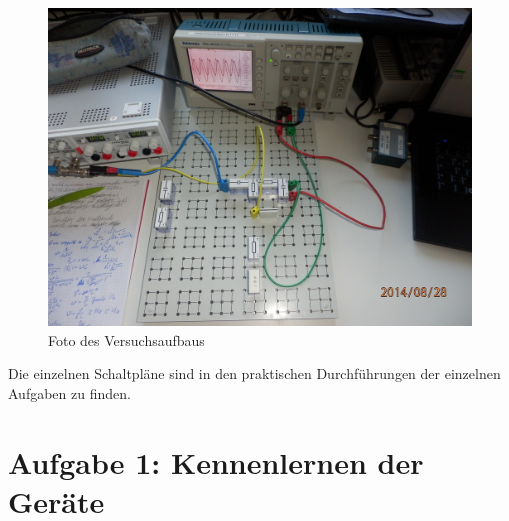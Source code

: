 \documentclass[12pt]{scrartcl}
\begin{document}
\begin{figure}[htbp] 
  \centering
    \includegraphics[scale = 0.1]{aufbau.JPG}
  	\caption[Foto des Versuchsaufbaus]{Foto des Versuchsaufbaus}
  \label{fig:teil_6}
\end{figure}

Die einzelnen Schaltpläne sind in den praktischen Durchführungen der einzelnen Aufgaben zu finden.
\newpage

\section{Aufgabe 1: Kennenlernen der Geräte}
\end{document}
